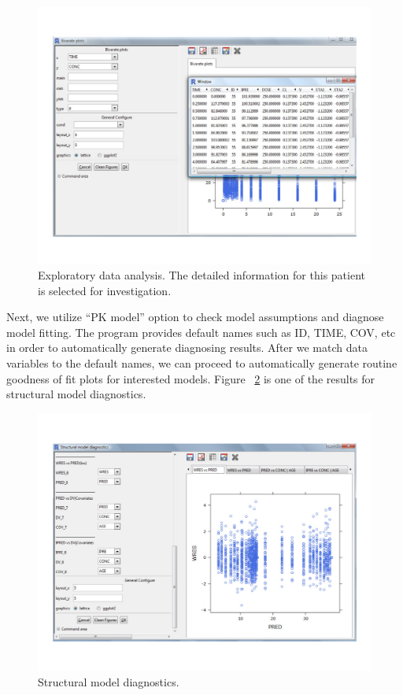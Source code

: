 \documentclass[a4paper]{article}
\begin{document}
\begin{figure}[h!tb]
\centering
\includegraphics[scale=0.6]{c4_s2_5eda2.pdf}
\caption{Exploratory data analysis. The detailed information for this patient is selected for investigation.}
\label{c4_s2_5eda2}
\end{figure}
\newline
\newline
Next, we utilize ``PK model'' option to check model assumptions and diagnose model fitting. The program provides default names such as ID, TIME, COV, etc in order to automatically generate diagnosing results. After we match data variables to the default names, we can proceed to automatically generate routine goodness of fit plots for interested models. Figure ~\ref{c4_s2_6} is one of the results for structural model diagnostics.
\begin{figure}[h!tb]
\centering
\includegraphics[scale=0.6]{c4_s2_6.pdf}
\caption{Structural model diagnostics.}
\label{c4_s2_6}
\end{figure}
\end{document}
